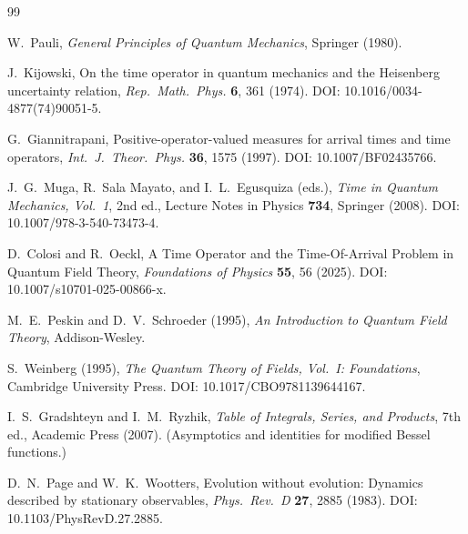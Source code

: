 \documentclass[pdflatex,sn-mathphys-num]{sn-jnl}
\theoremstyle{thmstylethree}
\theoremstyle{thmstyleone}
\theoremstyle{thmstyletwo}
\numberwithin{equation}{section}
\begin{document}
        \begin{thebibliography}{99}
            
            W.~Pauli,
            \textit{General Principles of Quantum Mechanics},
            Springer (1980).
            
            J.~Kijowski,
            On the time operator in quantum mechanics and the Heisenberg uncertainty relation,
            \textit{Rep.\ Math.\ Phys.} \textbf{6}, 361 (1974).
            DOI: 10.1016/0034-4877(74)90051-5.
            
            G.~Giannitrapani,
            Positive-operator-valued measures for arrival times and time operators,
            \textit{Int.\ J.\ Theor.\ Phys.} \textbf{36}, 1575 (1997).
            DOI: 10.1007/BF02435766.
            
            J.~G.~Muga, R.~Sala Mayato, and I.~L.~Egusquiza (eds.),
            \textit{Time in Quantum Mechanics, Vol.~1},
            2nd ed., Lecture Notes in Physics \textbf{734},
            Springer (2008).
            DOI: 10.1007/978-3-540-73473-4.
            
            D.~Colosi and R.~Oeckl,
            A Time Operator and the Time-Of-Arrival Problem in Quantum Field Theory,
            \textit{Foundations of Physics} \textbf{55}, 56 (2025).
            DOI: 10.1007/s10701-025-00866-x.
            
            M.~E.~Peskin and D.~V.~Schroeder (1995),
            \textit{An Introduction to Quantum Field Theory},
            Addison-Wesley.
            
            S.~Weinberg (1995),
            \textit{The Quantum Theory of Fields, Vol.\ I: Foundations},
            Cambridge University Press.
            DOI: 10.1017/CBO9781139644167.
            
            I.~S.~Gradshteyn and I.~M.~Ryzhik,
            \textit{Table of Integrals, Series, and Products},
            7th ed., Academic Press (2007).
            (Asymptotics and identities for modified Bessel functions.)
            
            D.~N.~Page and W.~K.~Wootters,
            Evolution without evolution: Dynamics described by stationary observables,
            \textit{Phys.\ Rev.\ D} \textbf{27}, 2885 (1983).
            DOI: 10.1103/PhysRevD.27.2885.
            

\end{thebibliography}
\end{document}

